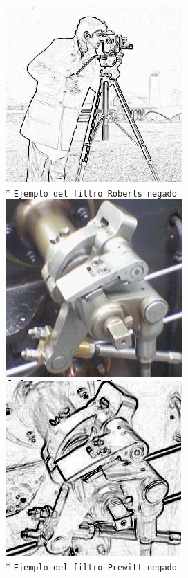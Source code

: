 \begin{center}
\includegraphics[scale=0.5]{imgs/cameraman-roberts-neg.jpg} \\*
\texttt{\small Ejemplo del filtro Roberts negado}\\
\vspace{1.0cm}
\includegraphics[scale=0.5]{imgs/steam-engine.jpg}
\includegraphics[scale=0.5]{imgs/steam-engine-prewitt-neg.jpg} \\*
\texttt{\small Ejemplo del filtro Prewitt negado} \\
\end{center}
\vspace{1cm}
\pagebreak

